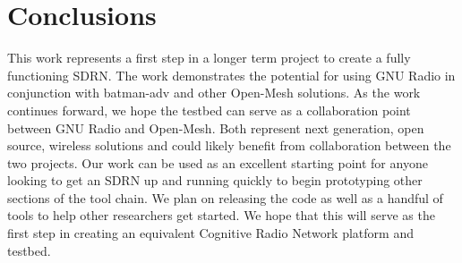 \section{Conclusions}

This work represents a first step in a longer term project to create a fully functioning SDRN. The work demonstrates the potential for using GNU Radio in conjunction with batman-adv and other Open-Mesh solutions. As the work continues forward, we hope the testbed can serve as a collaboration point between GNU Radio and Open-Mesh. Both represent next generation, open source, wireless solutions and could likely benefit from collaboration between the two projects. Our work can be used as an excellent starting point for anyone looking to get an SDRN up and running quickly to begin prototyping other sections of the tool chain. We plan on releasing the code as well as a handful of tools to help other researchers get started. We hope that this will serve as the first step in creating an equivalent Cognitive Radio Network platform and testbed. 